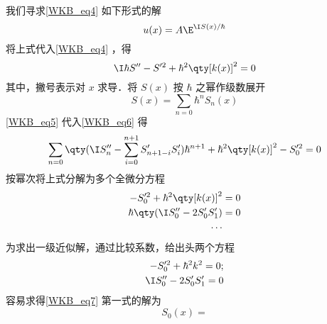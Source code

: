 我们寻求\autoref{WKB_eq4} 如下形式的解
\begin{equation}
u(x)=A\E^{\I S(x)/\hbar}
\end{equation}
将上式代入\autoref{WKB_eq4} ，得
\begin{equation}\label{WKB_eq6}
\I\hbar S''-S'^2+\hbar^2\qty[k(x)]^2=0
\end{equation}
其中，撇号表示对 $x$ 求导．将 $S(x)$ 按 $\hbar$ 之幂作级数展开
\begin{equation}\label{WKB_eq5}
S(x)=\sum_{n=0}\hbar^nS_n(x)
\end{equation}
\autoref{WKB_eq5} 代入\autoref{WKB_eq6} 得
\begin{equation}
\sum_{n=0}\qty(\I S_n''-\sum_{i=0}^{n+1}S_{n+1-i}'S_i')\hbar^{n+1}+\hbar^2\qty[k(x)]^2-S_0'^2=0
\end{equation}
按幂次将上式分解为多个全微分方程
\begin{equation}
\begin{aligned}
-S_0'^2+\hbar^2\qty[k(x)]^2&=0\\
\hbar\qty(\I S_0''-2S_0'S_1')&=0\\
\cdots
\end{aligned}
\end{equation}
为求出一级近似解，通过比较系数，给出头两个方程
\begin{equation}\label{WKB_eq7}
\begin{aligned}
-S_0'^2+\hbar^2k^2=0;\\
\I S_0''-2S_0'S_1'=0
\end{aligned}
\end{equation}
容易求得\autoref{WKB_eq7} 第一式的解为
\begin{equation}
S_0(x)=
\end{equation}


